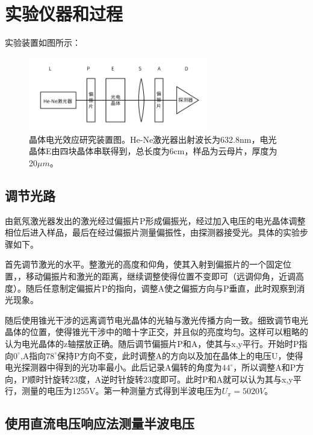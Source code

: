 \documentclass[aps,pre,12pt,preprint,onecolumn,showpacs,showkeys,UTF8]{revtex4-1}
\begin{document}
\section{实验仪器和过程}
实验装置如图所示：
\begin{figure}[h]
	\begin{center}
		\includegraphics[width=0.7\textwidth]{pic1.png}
		\caption{\label{g:1}晶体电光效应研究装置图。He-Ne激光器出射波长为632.8nm，电光晶体E由四块晶体串联得到，总长度为6cm，样品为云母片，厚度为20$\mu m$。}
	\end{center}
\end{figure}
\subsection{调节光路}

由氦氖激光器发出的激光经过偏振片P形成偏振光，经过加入电压的电光晶体调整相位后进入样品，最后在经过偏振片测量偏振性，由探测器接受光。具体的实验步骤如下。

首先调节激光的水平。整激光的高度和仰角，使其入射到偏振片的一个固定位置，，移动偏振片和激光的距离，继续调整使得位置不变即可（远调仰角，近调高度）。随后任意制定偏振片P的指向，调整A使之偏振方向与P垂直，此时观察到消光现象。

随后使用锥光干涉的远离调节电光晶体的光轴与激光传播方向一致。细致调节电光晶体的位置，使得锥光干涉中的暗十字正交，并且似的亮度均匀。这样可以粗略的认为电光晶体的z轴摆放正确。随后调节偏振片P和A，使其与x,y平行。开始时P指向$0^\circ$,A指向$78^\circ$保持P方向不变，此时调整A的方向以及加在晶体上的电压U，使得电光探测器中得到的光功率最小。此后记录A偏转的角度为$44^\circ$，所以调整A和P方向，P顺时针旋转23度，A逆时针旋转23度即可。此时P和A就可以认为其与x,y平行，测量的电压为1255V。第一种测量方式得到半波电压为$U_\pi=5020V$。

\subsection{使用直流电压响应法测量半波电压}
\end{document}
